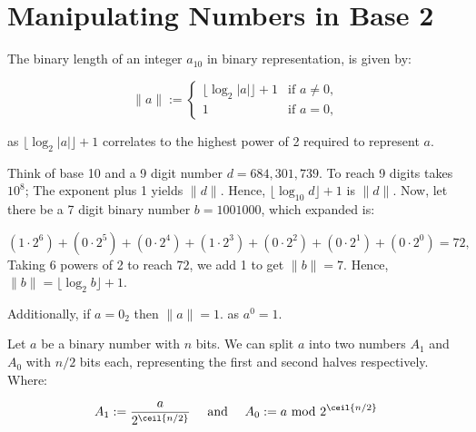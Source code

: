 \section{Manipulating Numbers in Base 2}

\label{sec:effic}

\begin{theo}
    
    The binary length of an integer $a_{10}$ in binary representation, is given by:
    
    \[
    \|a\| := 
    \begin{cases} 
    \lfloor \log_2 |a| \rfloor + 1 & \text{if } a \neq 0, \\
    1 & \text{if } a = 0,
    \end{cases}
    \]
    
    \noindent
    as $\lfloor \log_2 |a| \rfloor + 1$ correlates to the highest power of 2 required to represent $a$.
\end{theo}


\vspace{-1em}
\begin{Example}

\label{ex:log_length}

\vspace{-1em}
Think of base 10 and a 9 digit number $d=684,301,739$.
To reach 9 digits takes $10^8$; The exponent plus 1 yields $\|d\|$. Hence, $\lfloor \log_{10} d\rfloor+1$ is $\|d\|$.
Now, let there be a 7 digit binary number $b=1001000$, which expanded is:

$$ (1\cdot 2^6) + (0\cdot 2^5) + (0\cdot 2^4) + (1\cdot 2^3) + (0\cdot 2^2) + (0\cdot 2^1) + (0\cdot 2^0) = 72,$$
\noindent
Taking $6$ powers of 2 to reach $72$, we add 1 to get $\|b\| = 7$. Hence, $\|b\| = \lfloor \log_2 b \rfloor + 1$.

\noindent
Additionally, if $a=0_2$ then $\|a\|=1$. as $a^0=1$.
\end{Example}


\vspace{-.5em}
\begin{theo}

    Let $a$ be a binary number with $n$ bits. We can split $a$ into two numbers $A_1$ and $A_0$ with $n/2$ bits each,
    representing the first and second halves respectively. Where:
    
        $$A_1:=\frac{a}{2^{\ceil{n/2}}} \quad \text{ and } \quad A_0:=a \text{ mod } 2^{\ceil{n/2}}$$

\end{theo}

